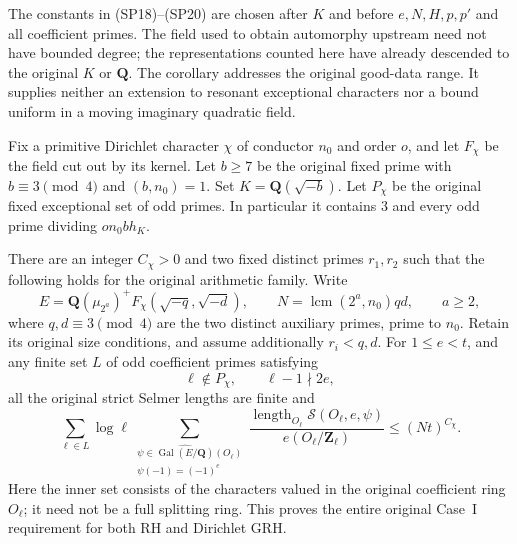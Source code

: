 The constants in (SP18)--(SP20) are chosen after $K$ and before
$e,N,H,p,p'$ and all coefficient primes.  The field used to
obtain automorphy upstream need not have bounded degree; the
representations counted here have already descended to the
original $K$ or $\mathbf Q$.  The corollary addresses the
original good-data range.  It supplies neither an extension
to resonant exceptional characters nor a bound uniform in a
moving imaginary quadratic field.

\begin{corollary}
\label{cor:support-spectrum-case-one}
Fix a primitive Dirichlet character $\chi$ of conductor $n_0$
and order $o$, and let $F_\chi$ be the field cut out by its
kernel.  Let $b\ge7$
be the original fixed prime with $b\equiv3\pmod4$ and
$(b,n_0)=1$.  Set $K=\mathbf Q(\sqrt{-b})$.
Let $P_\chi$ be the original fixed exceptional set of odd
primes.  In particular it contains $3$ and every odd prime
dividing $on_0b h_K$.

There are an integer $C_\chi>0$ and two fixed distinct
primes $r_1,r_2$ such that the following holds for the
original arithmetic family.  Write
\[
 E=\mathbf Q(\mu_{2^a})^+F_\chi(\sqrt{-q},\sqrt{-d}),
 \qquad N=\operatorname{lcm}(2^a,n_0)qd,\qquad a\ge2,
                                                               \tag{SP21}
\]
where $q,d\equiv3\pmod4$ are the two distinct auxiliary
primes, prime to $n_0$.  Retain its original size conditions,
and assume additionally $r_i<q,d$.  For $1\le e<t$, and
any finite set $L$ of odd coefficient primes satisfying
\[
              \ell\notin P_\chi,\qquad \ell-1\nmid2e,
                                                               \tag{SP22}
\]
all the original strict Selmer lengths are finite and
\[
 \sum_{\ell\in L}\log\ell
       \sum_{\substack{\psi\in\widehat{\operatorname{Gal}(E/\mathbf Q)}
                         (O_\ell)\\\psi(-1)=(-1)^e}}
       \frac{\operatorname{length}_{O_\ell}\mathcal S(O_\ell,e,\psi)}
            {e(O_\ell/\mathbf Z_\ell)}
                      \le (Nt)^{C_\chi}.                     \tag{SP23}
\]
Here the inner set consists of the characters valued in the
original coefficient ring $O_\ell$; it need not be a full
splitting ring.  This proves the entire original Case~I
requirement for both RH and Dirichlet GRH.
\end{corollary}

